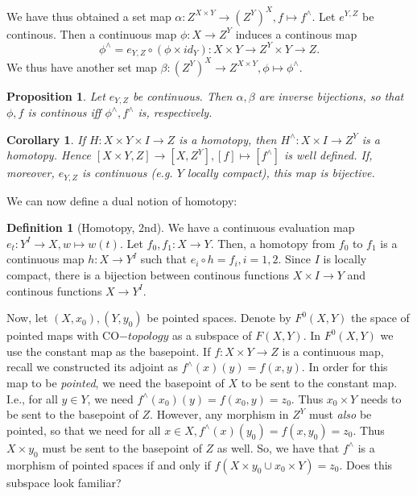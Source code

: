 \documentclass{article}
\newtheorem{cor}{Corollary}[section]
\newtheorem{prop}{Proposition}[section]
\theoremstyle{definition}
\newtheorem{defn}{Definition}[section]
\begin{document}
   We have thus obtained a set map $\alpha:Z^{X\times Y}\rightarrow (Z^{Y})^{X},f\mapsto f^{\wedge}$. Let $e^{Y,Z}$ be continous. Then a continuous map $\phi:X\rightarrow Z^{Y}$ induces a continous map
   \[\phi^{\wedge}=e_{Y,Z}\circ(\phi\times id_{Y}):X\times Y\rightarrow Z^{Y}\times Y\rightarrow Z. \] We thus have another set map $\beta:(Z^{Y})^{X}\rightarrow Z^{X\times Y},\phi\mapsto\phi^{\wedge}.$ 
   \begin{prop} Let $e_{Y,Z}$ be continuous. Then $\alpha,\beta$ are inverse bijections, so that $\phi,f$ is continous iff $\phi^{\wedge},f^{\wedge}$ is, respectively. \   
   \end{prop}
   \begin{cor}
   If $H:X\times Y\times I\rightarrow Z$ is a homotopy, then $H^{\wedge}:X\times I\rightarrow Z^{Y}$ is a homotopy. Hence $[X\times Y,Z]\rightarrow[X,Z^{Y}],[f]\mapsto[f^{\wedge}]$ is well defined. If, moreover, $e_{Y,Z}$ is continuous (e.g. $Y$ locally compact), this map is bijective.
   \end{cor}
   We can now define a dual notion of homotopy:
   \begin{defn}[Homotopy, 2nd]
   We have a continuous evaluation map $e_{t}:Y^{I}\rightarrow X,w\mapsto w(t).$ Let $f_{0},f_{1}:X\rightarrow Y.$ Then, a homotopy from $f_{0}$ to $f_{1}$ is a continuous map $h:X\rightarrow Y^{I}$ such that $e_{i}\circ h=f_{i},i=1,2.$ Since $I$ is locally compact, there is a bijection between continous functions $X\times I\rightarrow Y$ and continous functions $X\rightarrow Y^{I}.$ 
   \end{defn}
   
   Now, let $(X,x_{0}),(Y,y_{0})$ be pointed spaces. Denote by $F^{0}(X,Y)$ the space of pointed maps with CO$-topology$ as a subspace of $F(X,Y)$. In $F^{0}(X,Y)$ we use the constant map as the basepoint. If $f:X\times Y\rightarrow Z$ is a continuous map, recall we constructed its adjoint as $f^{\wedge}(x)(y)=f(x,y).$ In order for this map to be \textit{pointed}, we need the basepoint of $X$ to be sent to the constant map. I.e., for all $y\in Y$, we need  $f^{\wedge}(x_{0})(y)=f(x_{0},y)=z_{0}.$ Thus $x_{0}\times Y$ needs to be sent to the basepoint of $Z$. However, any morphism in $Z^{Y}$ must \textit{also} be pointed, so that we need for all $x\in X,f^{\wedge}(x)(y_{0})=f(x,y_{0})=z_{0}.$ Thus $X\times y_{0}$ must be sent to the basepoint of $Z$ as well. So, we have that $f^{\wedge}$ is a morphism of pointed spaces if and only if $f(X\times y_{0}\cup x_{0}\times Y)=z_{0}.$ Does this subspace look familiar? 
   
\end{document}
